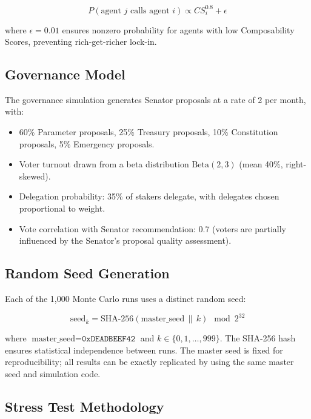 \begin{equation}
  P(\text{agent } j \text{ calls agent } i) \propto CS_i^{0.8} + \epsilon
\end{equation}

where $\epsilon = 0.01$ ensures nonzero probability for agents with low
Composability Scores, preventing rich-get-richer lock-in.

\subsection{Governance Model}
\label{subsec:sim-gov}

The governance simulation generates Senator proposals at a rate of 2 per month,
with:
\begin{itemize}
  \item 60\% Parameter proposals, 25\% Treasury proposals, 10\% Constitution
    proposals, 5\% Emergency proposals.
  \item Voter turnout drawn from a beta distribution
    $\text{Beta}(2, 3)$ (mean 40\%, right-skewed).
  \item Delegation probability: 35\% of stakers delegate, with delegates
    chosen proportional to \veCORTEX{} weight.
  \item Vote correlation with Senator recommendation: 0.7 (voters are
    partially influenced by the Senator's proposal quality assessment).
\end{itemize}

\subsection{Random Seed Generation}
\label{subsec:seeds}

Each of the 1{,}000 Monte Carlo runs uses a distinct random seed:

\begin{equation}
  \text{seed}_k = \text{SHA-256}(\text{master\_seed} \,\|\, k) \mod 2^{32}
\end{equation}

where $\text{master\_seed} = \texttt{0xDEADBEEF42}$ and $k \in \{0, 1,
\ldots, 999\}$. The SHA-256 hash ensures statistical independence between
runs. The master seed is fixed for reproducibility; all results can be exactly
replicated by using the same master seed and simulation code.

\subsection{Stress Test Methodology}
\label{subsec:sim-stress-method}

